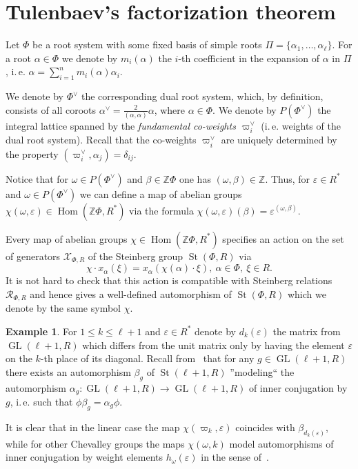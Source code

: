 \documentclass[oneside, 10pt]{amsart}
\DeclareMathOperator{\St}{St}
\DeclareMathOperator{\Hom}{Hom}
\DeclareMathOperator{\GL}{GL}
\newcommand{\ZZ}{\mathbb{Z}}
\newcommand{\XX}{\mathcal{X}}           %
\newcommand{\RR}[1]{\mathcal{R}_{#1}}   %
\numberwithin{equation}{section}
\numberwithin{lemma}{section}
\theoremstyle{definition}
\newtheorem{example}[lemma]{Example}
\theoremstyle{remark}
\begin{document}
\section{Tulenbaev's factorization theorem}
Let $\Phi$ be a root system with some fixed basis of simple roots $\Pi = \{\alpha_1, \ldots, \alpha_\ell\}$.
For a root $\alpha\in\Phi$ we denote by $m_i(\alpha)$ the $i$-th coefficient in the expansion of $\alpha$ in $\Pi$,
 i.\,e. $\alpha = \sum_{i=1}^n m_i(\alpha) \alpha_i$.

We denote by $\Phi^\vee$ the corresponding dual root system, which, by definition, consists of all coroots 
 $\alpha^\vee = \frac{2}{(\alpha, \alpha)} \alpha$, where $\alpha \in \Phi$.
We denote by $P(\Phi^\vee)$ the integral lattice spanned by the \emph{fundamental co-weights $\varpi^\vee_i$} (i.\,e. weights of the dual root system).
Recall that the co-weights $\varpi^\vee_i$ are uniquely determined by the property $(\varpi_i^\vee, \alpha_j) = \delta_{ij}$.

Notice that for $\omega \in P(\Phi^\vee)$ and $\beta \in \ZZ \Phi$ one has $(\omega, \beta) \in \ZZ $.
Thus, for $\varepsilon \in R^*$ and $\omega \in P(\Phi^\vee)$ we can define a map of abelian groups $\chi(\omega, \varepsilon) \in \Hom(\ZZ \Phi, R^*)$
 via the formula $\chi(\omega, \varepsilon)(\beta) = \varepsilon ^ {(\omega, \beta)}$.

Every map of abelian groups $\chi \in \Hom(\ZZ \Phi, R^*)$ specifies an action on the set of generators $\XX_{\Phi, R}$ of the Steinberg group $\St(\Phi, R)$ via
\begin{equation*} \chi \cdot x_\alpha(\xi) = x_\alpha(\chi(\alpha) \cdot \xi),\ \alpha\in \Phi,\ \xi \in R. \end{equation*}
It is not hard to check that this action is compatible with Steinberg relations $\RR{\Phi, R}$ and 
 hence gives a well-defined automorphism of $\St(\Phi, R)$ which we denote by the same symbol $\chi$.
 
\begin{example} \label{exm:chi-linear}
For $1\leq k\leq \ell+1$ and $\varepsilon \in R^*$ denote by $d_k(\varepsilon)$ the matrix from $\GL(\ell+1, R)$ which differs from the unit matrix 
 only by having the element $\varepsilon$ on the $k$-th place of its diagonal.
Recall from~\cite[Corollary~4]{Ka77} that for any $g \in \GL(\ell+1, R)$ there exists an automorphism $\beta_g$ of $\St(\ell+1, R)$ 
 ''modeling`` the automorphism $\alpha_g \colon \GL(\ell+1, R) \to \GL(\ell+1, R)$ of inner conjugation by $g$, i.\,e. such that $\phi \beta_g = \alpha_g \phi$.

It is clear that in the linear case the map $\chi(\varpi_k, \varepsilon)$ coincides with $\beta_{d_k(\varepsilon)}$, 
 while for other Chevalley groups the maps $\chi(\omega, k)$ model automorphisms of inner conjugation by weight elements $h_\omega(\varepsilon)$
  in the sense of~\cite[\S~4]{Vav09}.
\end{example}
\end{document}
